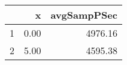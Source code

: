\begin{table}[h]
\centering
\begin{tabular}{rrr}
  \hline
 & x & avgSampPSec \\ 
  \hline
1 & 0.00 & 4976.16 \\ 
   \hline
2 & 5.00 & 4595.38 \\ 
   \hline
\end{tabular}
\end{table}
